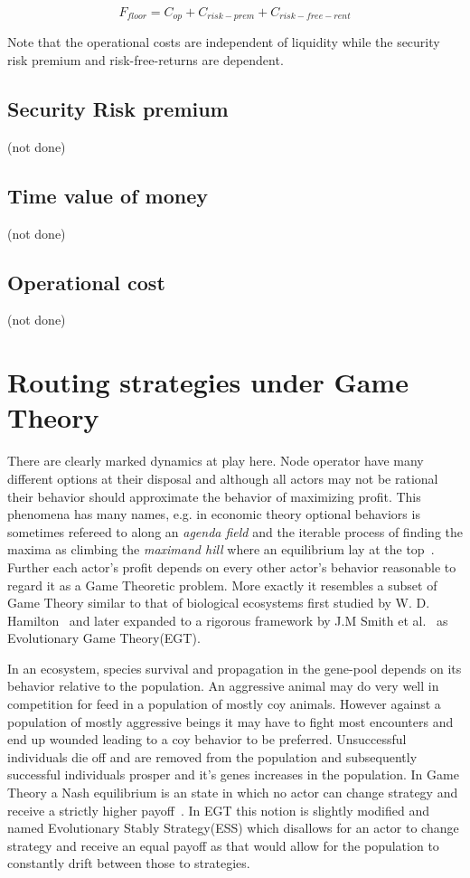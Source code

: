 \[ F_{floor} = C_{op} + C_{risk-prem} + C_{risk-free-rent} \]

Note that the operational costs are independent of liquidity while the security risk premium and risk-free-returns are dependent.

\subsection{Security Risk premium}
(not done)
\subsection{Time value of money}
(not done)
\subsection{Operational cost}
(not done)

\section{Routing strategies under Game Theory}

There are clearly marked dynamics at play here. Node operator have many different options at their disposal and although all actors may not be rational their behavior should approximate the behavior of maximizing profit. This phenomena has many names, e.g. in economic theory optional behaviors is sometimes refereed to along an \textit{agenda field} and the iterable process of finding the maxima as climbing the \textit{maximand hill} where an equilibrium lay at the top~\cite{boulding:evolutionary:economy}. Further each actor's profit depends on every other actor's behavior reasonable to regard it as a Game Theoretic problem. More exactly it resembles a subset of Game Theory similar to that of biological ecosystems first studied by W. D. Hamilton~\cite{hamilton:behavior} and later expanded to a rigorous framework by J.M Smith et al.~\cite{smith:price:logic:animal, smith:evolution:games} as Evolutionary Game Theory(EGT).

In an ecosystem, species survival and propagation in the gene-pool depends on its behavior relative to the population. An aggressive animal may do very well in competition for feed in a population of mostly coy animals. However against a population of mostly aggressive beings it may have to fight most encounters and end up wounded leading to a coy behavior to be preferred. Unsuccessful individuals die off and are removed from the population and subsequently successful individuals prosper and it's genes increases in the population. In Game Theory a Nash equilibrium is an state in which no actor can change strategy and receive a strictly higher payoff~\cite{nash:equilibrium}. In EGT this notion is slightly modified and named Evolutionary Stably Strategy(ESS) which disallows for an actor to change strategy and receive an equal payoff as that would allow for the population to constantly drift between those to strategies. 


